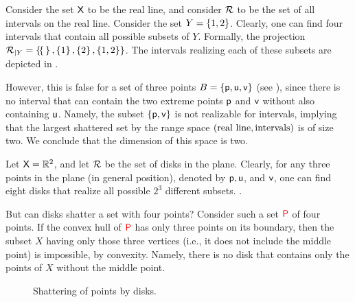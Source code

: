 Consider the set $\textsf{X}$ to be the real line, and consider
${\mathcal{R}}$ to be the set of all intervals on the real line.
Consider the set $Y = \left\{ {1,2} \right\}$.  Clearly, one can find four
intervals that contain all possible subsets of $Y$.  Formally, the
projection
${\mathcal{R}}_{|Y} = \left\{ { \! \left\{ {\,} \right\}, \left\{ { 1 } \right\},
   \left\{ {2} \right\}, \left\{ {1,2} \right\} } \right\}$. The intervals realizing each of these
subsets are depicted in  .

However, this is false for a set of three
points $B = \left\{ {\mathsf{p},\mathsf{u},\mathsf{v}} \right\}$ (see  ),
since there is no interval that
can contain the two extreme points $\mathsf{p}$ and $\mathsf{v}$ without also
containing $\mathsf{u}$. Namely, the subset $\left\{ {\mathsf{p},\mathsf{v}} \right\}$ is not
realizable for intervals, implying that the largest shattered set by
the range space $\pth[]{\text{real line}, \text{intervals} }$ is of
size two. We conclude that the \VC dimension of this space is two.



Let $\textsf{X} = \mathbb{R}^2$, and let ${\mathcal{R}}$ be the set of disks in the
plane. Clearly, for any three points in the plane (in general position),
denoted by $\mathsf{p}, \mathsf{u}$, and $\mathsf{v}$, one can find eight disks that
realize all possible $2^3$ different subsets.   .

But can disks shatter a set with four points? Consider such a set
${{\textcolor{red}{\mathsf{P}}}}$ of four points. If the convex hull of ${{\textcolor{red}{\mathsf{P}}}}$ has only three
points on its boundary, then the subset $X$ having only those three
vertices (i.e., it does not include the middle point) is impossible, by
convexity. Namely, there is no disk that contains only the points of $X$
without the middle point.

\begin{figure}[h]
    \centering%
    \caption{Shattering of points by disks.}
\end{figure}



